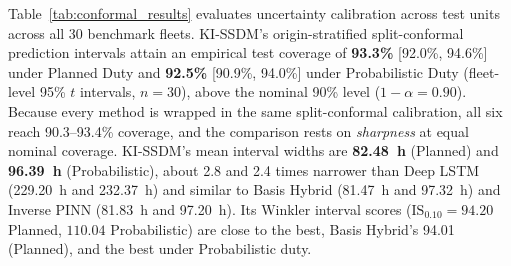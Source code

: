 \documentclass[a4paper,fleqn]{cas-dc}
\begin{document}
Table~\ref{tab:conformal_results} evaluates uncertainty calibration across test units across all 30 benchmark fleets. KI-SSDM's origin-stratified split-conformal prediction intervals attain an empirical test coverage of \textbf{93.3\%} [92.0\%, 94.6\%] under Planned Duty and \textbf{92.5\%} [90.9\%, 94.0\%] under Probabilistic Duty (fleet-level 95\% $t$ intervals, $n = 30$), above the nominal 90\% level ($1 - \alpha = 0.90$). Because every method is wrapped in the same split-conformal calibration, all six reach 90.3--93.4\% coverage, and the comparison rests on \emph{sharpness} at equal nominal coverage. KI-SSDM's mean interval widths are \textbf{82.48~h} (Planned) and \textbf{96.39~h} (Probabilistic), about 2.8 and 2.4 times narrower than Deep LSTM (229.20~h and 232.37~h) and similar to Basis Hybrid (81.47~h and 97.32~h) and Inverse PINN (81.83~h and 97.20~h). Its Winkler interval scores ($\mathrm{IS}_{0.10} = 94.20$ Planned, $110.04$ Probabilistic) are close to the best, Basis Hybrid's 94.01 (Planned), and the best under Probabilistic duty.
\end{document}

